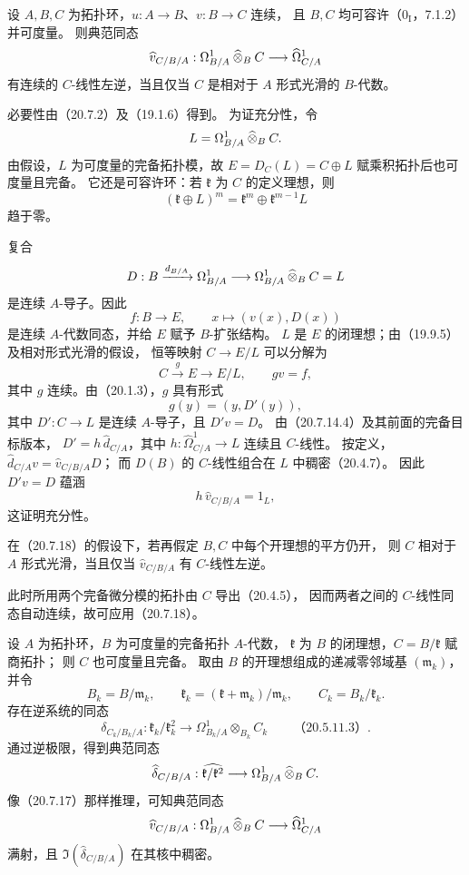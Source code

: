 设 $A,B,C$ 为拓扑环，$u:A\to B$、$v:B\to C$ 连续，
且 $B,C$ 均可容许（$0_{\mathrm I}$，7.1.2）并可度量。
则典范同态
\[
 \widehat v_{C/B/A}:
 \Omega^1_{B/A}\mathbin{\widehat{\otimes}}_B C\longrightarrow\widehat{\Omega}^1_{C/A}
\]
有连续的 $C$-线性左逆，当且仅当
$C$ 是相对于 $A$ 形式光滑的 $B$-代数。

必要性由（20.7.2）及（19.1.6）得到。
为证充分性，令
\[
 L=\Omega^1_{B/A}\mathbin{\widehat{\otimes}}_B C .
\]
由假设，$L$ 为可度量的完备拓扑模，故
$E=D_C(L)=C\oplus L$ 赋乘积拓扑后也可度量且完备。
它还是可容许环：若 $\mathfrak k$ 为 $C$ 的定义理想，则
\[
 (\mathfrak k\oplus L)^m
 =\mathfrak k^m\oplus\mathfrak k^{m-1}L
\]
趋于零。

复合
\[
 D:B\xrightarrow{d_{B/A}}\Omega^1_{B/A}
 \longrightarrow\Omega^1_{B/A}\mathbin{\widehat{\otimes}}_B C=L
\]
是连续 $A$-导子。因此
\[
 f:B\longrightarrow E,\qquad x\longmapsto(v(x),D(x))
\]
是连续 $A$-代数同态，并给 $E$ 赋予 $B$-扩张结构。
$L$ 是 $E$ 的闭理想；由（19.9.5）及相对形式光滑的假设，
恒等映射 $C\to E/L$ 可以分解为
\[
 C\xrightarrow{g}E\longrightarrow E/L ,
 \qquad gv=f,
\]
其中 $g$ 连续。由（20.1.3），$g$ 具有形式
\[
 g(y)=(y,D'(y)),
\]
其中 $D':C\to L$ 是连续 $A$-导子，且 $D'v=D$。
由（20.7.14.4）及其前面的完备目标版本，
$D'=h\,\widehat d_{C/A}$，其中
$h:\widehat{\Omega}^1_{C/A}\to L$ 连续且 $C$-线性。
按定义，
$\widehat d_{C/A}v=\widehat v_{C/B/A}D$；
而 $D(B)$ 的 $C$-线性组合在 $L$ 中稠密（20.4.7）。
因此 $D'v=D$ 蕴涵
\[
 h\,\widehat v_{C/B/A}=1_L ,
\]
这证明充分性。

在（20.7.18）的假设下，若再假定 $B,C$ 中每个开理想的平方仍开，
则 $C$ 相对于 $A$ 形式光滑，当且仅当
$\widehat v_{C/B/A}$ 有 $C$-线性左逆。

此时所用两个完备微分模的拓扑由 $C$ 导出（20.4.5），
因而两者之间的 $C$-线性同态自动连续，故可应用（20.7.18）。

设 $A$ 为拓扑环，$B$ 为可度量的完备拓扑 $A$-代数，
$\mathfrak k$ 为 $B$ 的闭理想，$C=B/\mathfrak k$ 赋商拓扑；
则 $C$ 也可度量且完备。
取由 $B$ 的开理想组成的递减零邻域基 $(\mathfrak m_k)$，
并令
\[
 B_k=B/\mathfrak m_k,\qquad
 \mathfrak k_k=(\mathfrak k+\mathfrak m_k)/\mathfrak m_k,\qquad
 C_k=B_k/\mathfrak k_k .
\]
存在逆系统的同态
\[
 \delta_{C_k/B_k/A}:\mathfrak k_k/\mathfrak k_k^2
 \longrightarrow\Omega^1_{B_k/A}\otimes_{B_k}C_k
 \qquad\text{（20.5.11.3）}.
\]
通过逆极限，得到典范同态
\[
 \widehat\delta_{C/B/A}:
 \widehat{\mathfrak k/\mathfrak k^2}
 \longrightarrow\Omega^1_{B/A}\mathbin{\widehat{\otimes}}_B C .
\]
像（20.7.17）那样推理，可知典范同态
\[
 \widehat v_{C/B/A}:
 \Omega^1_{B/A}\mathbin{\widehat{\otimes}}_B C\longrightarrow\widehat{\Omega}^1_{C/A}
\]
满射，且 $\Im(\widehat\delta_{C/B/A})$ 在其核中稠密。
